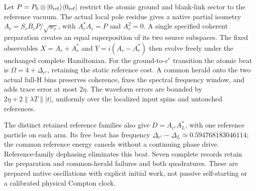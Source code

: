 Let $P=P_0\otimes|0_{\rm ref}\rangle\langle0_{\rm ref}|$ restrict
the atomic ground and blank-link sector to the reference vacuum.
The actual local pole residue gives a native partial isometry
$A_r=S_rB_rP/\sqrt{w_r}$, with $A_r^*A_r=P$ and $A_r^2=0$.
A single specified coherent preparation creates an equal superposition
of its two source subspaces. The fixed observables $X=A_r+A_r^*$ and
$Y=i(A_r-A_r^*)$ then evolve freely under the unchanged complete
Hamiltonian. For the ground-to-$e^c$ transition the atomic beat is
$\Omega=4+\Delta_{e^c}$, retaining the static reference cost. A common
herald onto the two actual full-H bins preserves coherence, fixes the
spectral frequency window, and adds trace error at most $2\eta$.
The waveform errors are bounded by $2\eta+2\|\lambda T\||t|$,
uniformly over the localized input spins and untouched references.

The distinct retained reference families also give
$D=A_{e^c}A_L^*$, with one reference particle on each arm. Its free
beat has frequency $\Delta_{e^c}-\Delta_L\simeq0.594768183046114$;
the common reference energy cancels without a continuing phase drive.
Reference-family dephasing eliminates this beat. Seven complete records
retain the preparation and common-herald failures and both quadratures.
These are prepared native oscillations with explicit initial work,
not passive self-starting or a calibrated physical Compton clock.
